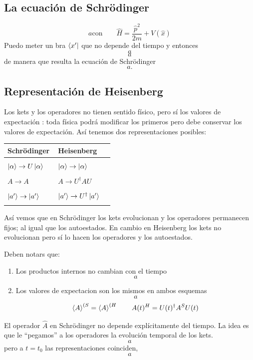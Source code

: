 \documentclass[10pt,oneside]{CBFT_book}
\begin{document}
\subsection{La ecuación de Schrödinger}

\[
	a \text{con} \qquad \hat{H} = \frac{\hat{p}^2}{2m} + V(\hat{x}) 
\]
Puedo meter un bra $\Bra{x'}$ que no depende del tiempo y entonces 
\[
	a
\]
\[
	a
\]
de manera que resulta la ecuación de Schrödinger
\[
	a .
\]

\subsection{Representación de Heisenberg}

Los kets y los operadores no tienen sentido físico, pero sí los valores de expectación : toda física podrá modificar 
los primeros pero debe conservar los valores de expectación. Así tenemos dos representaciones posibles:

\begin{center}
\begin{tabular}{|l|l|}
\hline
Schrödinger & Heisenberg \\
\hline
& \\
$\Ket{\alpha} \to U\Ket{\alpha} \quad $ & $\Ket{\alpha} \to \Ket{\alpha} \quad $ \\
& \\
$A \to A \quad $ & $A \to U^\dagger AU \quad$ \\
& \\
$\Ket{a'} \to \Ket{a'} \quad $ & $\Ket{a'} \to U^\dagger \Ket{a'} \quad $ \\
& \\
\hline
\end{tabular}
\end{center}
Así vemos que en Schrödinger los kets evolucionan y los operadores permanecen fijos; al igual que los autoestados.
En cambio en Heisenberg los kets no evolucionan pero sí lo hacen los operadores y los autoestados.

Deben notars que:
\begin{enumerate}
 \item Los productos internos no cambian con el tiempo
 \[
	a
 \]
 \item Los valores de expectacion son los mismos en ambos esquemas
 \[
	a
 \]
 \[
	\Braket{A}^{(S} = \Braket{A}^{(H} \qquad A(t)^H = U(t)^\dagger A^S U(t)
 \]
\end{enumerate}

El operador $\hat{A}$ en Schrödinger no depende explícitamente del tiempo. La idea es que le ``pegamos'' a los 
operadores la evolución temporal de los kets.
\[
	a
\]
pero a $t=t_0$ las representaciones coinciden,
\[
	a
\]
\end{document}
